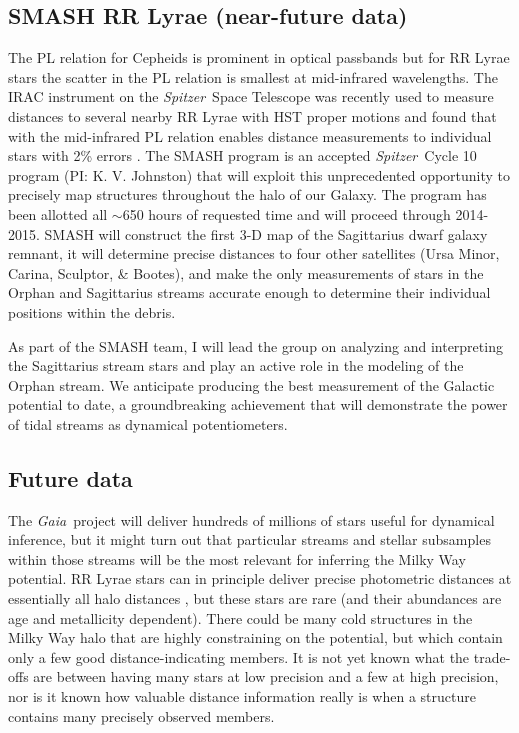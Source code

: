 \documentclass[letterpaper,12pt,preprint]{aastex}
\newcommand{\project}[1]{\textsl{#1}}
\newcommand{\gaia}{\project{Gaia}}
\newcommand{\spitzer}{\project{Spitzer}}
\begin{document}
\subsection{SMASH RR Lyrae (near-future data)}\label{sec:smash}
The PL relation for Cepheids is prominent in optical passbands but for RR Lyrae stars the scatter in the PL relation is smallest at mid-infrared wavelengths. The IRAC instrument on the \spitzer\ Space Telescope was recently used to measure distances to several nearby RR Lyrae with HST proper motions and found that with the mid-infrared PL relation enables distance measurements to individual stars with 2\% errors \citep{benedict11, madore12}. The SMASH program is an accepted \spitzer\ Cycle 10 program (PI: K. V. Johnston) that will exploit this unprecedented opportunity to precisely map structures throughout the halo of our Galaxy. The program has been allotted all $\sim$650 hours of requested time and will proceed through 2014-2015. SMASH will construct the first 3-D map of the Sagittarius dwarf galaxy remnant, it will determine precise distances to four other satellites (Ursa Minor, Carina, Sculptor, \& Bootes), and make the only measurements of stars in the Orphan and Sagittarius streams accurate enough to determine their individual positions within the debris. 

As part of the SMASH team, I will lead the group on analyzing and interpreting the Sagittarius stream stars and play an active role in the modeling of the Orphan stream. We anticipate producing the best measurement of the Galactic potential to date, a groundbreaking achievement that will demonstrate the power of tidal streams as dynamical potentiometers.

\subsection{Future data}
The \gaia\, project will deliver hundreds of millions of stars useful for dynamical inference, but it might turn out that particular streams and stellar subsamples within those streams will be the most relevant for inferring the Milky Way potential. RR Lyrae stars can in principle deliver precise photometric distances at essentially all halo distances \citep{madore12}, but these stars are rare (and their abundances are age and metallicity dependent). There could be many cold structures in the Milky Way halo that are highly constraining on the potential, but which contain only a few good distance-indicating members. It is not yet known what the trade-offs are between having many stars at low precision and a few at high precision, nor is it known how valuable distance information really is when a structure contains many precisely observed members. 
\end{document}
